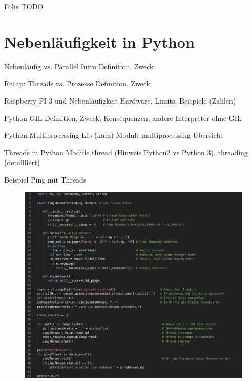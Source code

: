 \begin{frame}{Folie}
    TODO
\end{frame}

\section{Nebenläufigkeit in Python}

\begin{frame}{Nebenläufig vs. Parallel Intro}
    Definition, Zweck
\end{frame}

\begin{frame}{Recap: Threads vs. Prozesse}
    Definition, Zweck
\end{frame}

\begin{frame}{Raspberry PI 3 und Nebenläufigkeit}
	Hardware, Limits, Beispiele (Zahlen)
\end{frame}

\begin{frame}{Python GIL}
    Definition, Zweck, Konsequenzen, andere Interpreter ohne GIL
\end{frame}

\begin{frame}{Python Multiprocessing Lib (kurz)}
    Module multiprocessing Übersicht
\end{frame}

\begin{frame}{Threads in Python}
    Module thread (Hinweis Python2 vs Python 3), threading (detailliert)
\end{frame}

\begin{frame}{Beispiel Ping mit Threads}
    \begin{figure}[!htb]
        \includegraphics[scale=0.23]{6-python3/img/pingthreads}
    \end{figure}

\end{frame}

